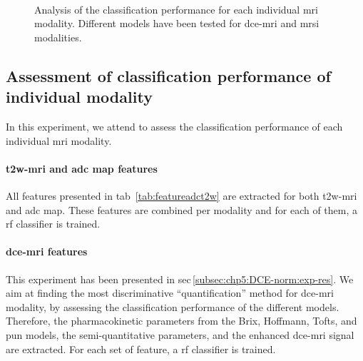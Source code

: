 \begin{landscape}
\begin{figure}
  \hspace*{\fill}
  \hfill
  \hspace*{\fill} \\
  \hspace*{\fill}
  \hfill
  \hspace*{\fill}
  \caption[Analysis of the classification performance for each
  individual \acs*{mri} modality.]{Analysis of the classification
    performance for each individual \acs*{mri} modality. Different
    models have been tested for \acs*{dce}-\acs*{mri} and \acs*{mrsi}
    modalities.}
  \label{fig:res-Ex1}
\end{figure}
\end{landscape}

\subsection{Assessment of classification performance of individual modality}\label{subec:chp6:exp-res:Ex1}

In this experiment, we attend to assess the classification performance of each individual \ac{mri} modality.

\paragraph{\ac{t2w}-\ac{mri} and \ac{adc} map features} All features presented in \acs{tab}~\ref{tab:featureadct2w} are extracted for both \ac{t2w}-\ac{mri} and \ac{adc} map.
These features are combined per modality and for each of them, a \ac{rf} classifier is trained.

\paragraph{\ac{dce}-\ac{mri} features} This experiment has been presented in \acs{sec}\,\ref{subsec:chp5:DCE-norm:exp-res}.
We aim at finding the most discriminative ``quantification'' method for \ac{dce}-\ac{mri} modality, by assessing the classification performance of the different models.
Therefore, the pharmacokinetic parameters from the Brix, Hoffmann, Tofts, and \ac{pun} models, the semi-quantitative parameters, and the enhanced \ac{dce}-\ac{mri} signal are extracted.
For each set of feature, a \ac{rf} classifier is trained.


